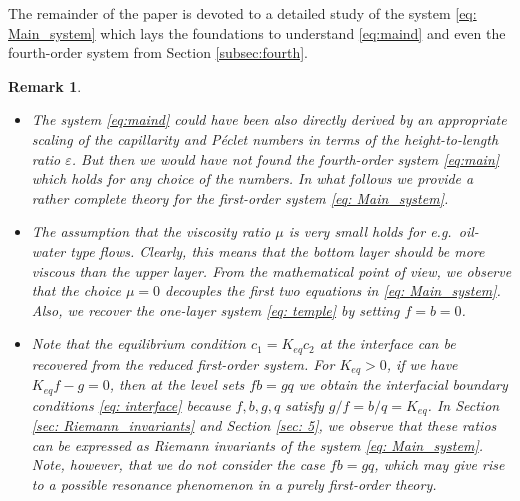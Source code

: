 \documentclass[11pt]{article}
\numberwithin{equation}{section}
\newtheorem{counter example}[theorem]{Counter Example}
\newtheorem{remark}[theorem] {Remark}
\begin{document}
{The remainder of the paper is devoted to a detailed study of the  system \eqref{eq: Main_system} which lays the foundations to understand \eqref{eq:maind} and even the fourth-order system from Section \ref{subsec:fourth}.

\begin{remark}
\begin{itemize}
\item[(i)] The system \eqref{eq:maind} could have been also directly derived by an appropriate scaling of the  capillarity 
and  P\'{e}clet numbers in terms of the height-to-length ratio $\varepsilon$. But then we would have not found the fourth-order system \eqref{eq:main} which holds for any choice of the numbers. In what follows we provide a rather complete theory for the first-order system \eqref{eq: Main_system}.    
%
%
\item[(ii)] The assumption that  the viscosity ratio $\mu$ is very small holds for e.g.\ oil-water type flows. Clearly, this means that the bottom layer should be more viscous than the upper layer. From the mathematical  point of view, we observe that  the choice $\mu =0$ decouples  the first two equations in \eqref{eq: Main_system}. Also, we recover the one-layer system \eqref{eq: temple} by setting $f=b=0$.
%
%
%
\item[(iii)]
Note that the equilibrium condition  $c_1=K_{eq}c_2$ at the interface can be recovered from the reduced first-order system. For $K_{eq}>0$, if we have  $K_{eq}f-g=0$, then at the level sets $fb=gq$ we  obtain the interfacial boundary conditions \eqref{eq: interface}  because $f, b, g, q$ satisfy $g/f=b/q=K_{eq}$. In Section \ref{sec: Riemann_invariants} and Section \ref{sec: 5}, we observe that these ratios can be expressed as Riemann invariants of the system \eqref{eq: Main_system}. Note, however, that we 
do not consider the case  $fb=gq$, which may give rise to a possible resonance phenomenon in a purely first-order theory.
\end{itemize}
\end{remark}

}
\end{document}
